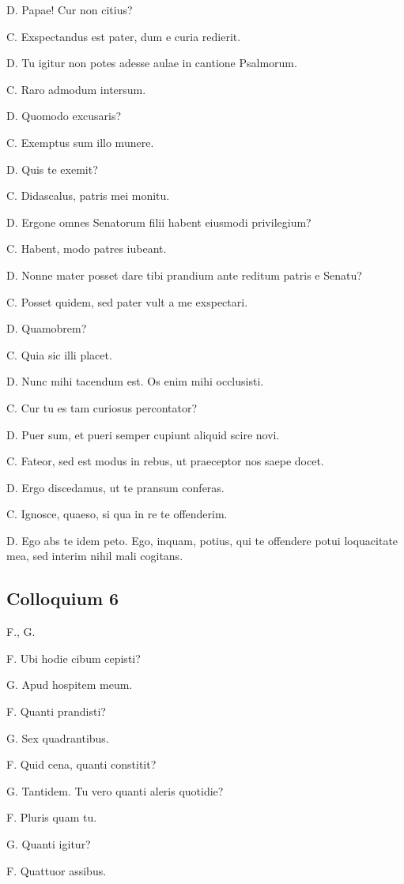 \documentclass{article}
\begin{document}
D. Papae! Cur non citius?

C. Exspectandus est pater, dum e curia redierit.

D. Tu igitur non potes adesse aulae in cantione Psalmorum.

C. Raro admodum intersum.

D. Quomodo excusaris?

C. Exemptus sum illo munere.

D. Quis te exemit?

C. Didascalus, patris mei monitu.

D. Ergone omnes Senatorum filii habent eiusmodi privilegium?

C. Habent, modo patres iubeant.

D. Nonne mater posset dare tibi prandium ante reditum patris e Senatu?

C. Posset quidem, sed pater vult a me exspectari.

D. Quamobrem?

C. Quia sic illi placet.

D. Nunc mihi tacendum est. Os enim mihi occlusisti.

C. Cur tu es tam curiosus percontator?

D. Puer sum, et pueri semper cupiunt aliquid scire novi.

C. Fateor, sed est modus in rebus, ut praeceptor nos saepe docet.

D. Ergo discedamus, ut te pransum conferas.

C. Ignosce, quaeso, si qua in re te offenderim.

D. Ego abs te idem peto. Ego, inquam, potius, qui te offendere potui loquacitate mea, sed interim nihil mali cogitans.

\subsection{Colloquium 6}
F., G.

F. Ubi hodie cibum cepisti?

G. Apud hospitem meum.

F. Quanti prandisti?

G. Sex quadrantibus.

F. Quid cena, quanti constitit?

G. Tantidem. Tu vero quanti aleris quotidie?

F. Pluris quam tu.

G. Quanti igitur?

F. Quattuor assibus.
\end{document}
